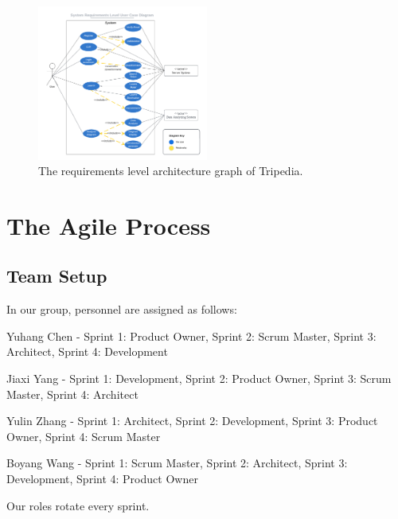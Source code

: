 \documentclass[conference]{IEEEtran}
\begin{document}
\begin{figure}[htbp]
\centerline{\includegraphics[width=0.5\textwidth]{user_diagram_system.pdf}}
\caption{The requirements level architecture graph of Tripedia.}
\label{system_level_user_case}
\end{figure}






\section{\textbf{The Agile Process}}


\subsection{\textbf{Team Setup}}

In our group, personnel are assigned as follows:

Yuhang Chen - Sprint 1: Product Owner, Sprint 2: Scrum Master, Sprint 3: Architect, Sprint 4: Development

Jiaxi Yang - Sprint 1: Development, Sprint 2: Product Owner, Sprint 3: Scrum Master, Sprint 4: Architect

Yulin Zhang - Sprint 1: Architect, Sprint 2: Development, Sprint 3: Product Owner, Sprint 4: Scrum Master

Boyang Wang - Sprint 1: Scrum Master, Sprint 2: Architect, Sprint 3: Development, Sprint 4: Product Owner

Our roles rotate every sprint.
\end{document}
